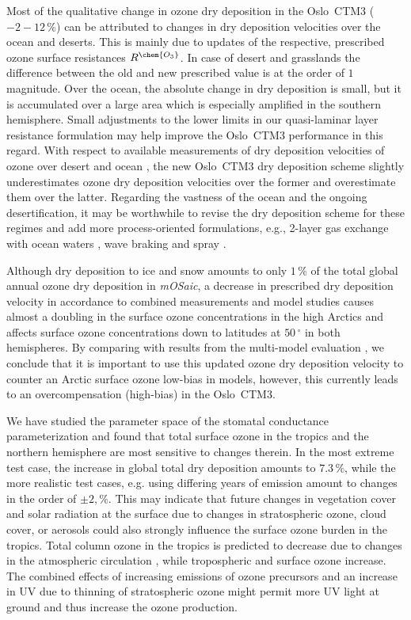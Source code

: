 \documentclass[gmd, manuscript]{copernicus}
\begin{document}
Most of the qualitative change in ozone dry deposition in the Oslo~CTM3 ($-2-12\,\unit{\%}$) can be attributed to changes in dry deposition velocities over the ocean and deserts. This is mainly due to updates of the respective, prescribed ozone surface resistances $R^\chem{O_3}$. In case of desert and grasslands the difference between the old and new prescribed value is at the order of $1$ magnitude. Over the ocean, the absolute change in dry deposition is small, but it is accumulated over a large area which is especially amplified in the southern hemisphere. Small adjustments to the lower limits in our quasi-laminar layer resistance formulation may help improve the Oslo~CTM3 performance in this regard. With respect to available measurements of dry deposition velocities of ozone over desert \citep{AE:Gusten1995} and ocean \citep{JGR:Helmig2012}, the new Oslo~CTM3 dry deposition scheme slightly underestimates ozone dry deposition velocities over the former and overestimate them over the latter. Regarding the vastness of the ocean and the ongoing desertification, it may be worthwhile to revise the dry deposition scheme for these regimes and add more process-oriented formulations, e.g., 2-layer gas exchange with ocean waters \citep{ACP:Luhar2017, ACP:Luhar2018}, wave braking and spray \citep{ACP:Pozzer2006}.

Although dry deposition to ice and snow amounts to only $1\,\unit{\%}$ of the total global annual ozone dry deposition in \emph{mOSaic}, a decrease in prescribed dry deposition velocity in accordance to combined measurements and model studies \citep{ACP:Helmig2007} causes almost a doubling in the surface ozone concentrations in the high Arctics and affects surface ozone concentrations down to latitudes at $50\,\unit{^\circ}$ in both hemispheres. By comparing with results from the multi-model evaluation \citep{ACP:Hardacre2015}, we conclude that it is important to use this updated ozone dry deposition velocity to counter an Arctic surface ozone low-bias in models, however, this currently leads to an overcompensation (high-bias) in the Oslo~CTM3.

We have studied the parameter space of the stomatal conductance parameterization and found that total surface ozone in the tropics and the northern hemisphere are most sensitive to changes therein. In the most extreme test case, the increase in global total dry deposition amounts to $7.3\,\unit{\%}$, while the more realistic test cases, e.g. using differing years of emission amount to changes in the order of $\pm 2,\unit{\%}$. This may indicate that future changes in vegetation cover and solar radiation at the surface due to changes in stratospheric ozone, cloud cover, or aerosols could also strongly influence the surface ozone burden in the tropics. Total column ozone in the tropics is predicted to decrease due to changes in the atmospheric circulation \citep[e.g.,][]{WMO2014}, while tropospheric and surface ozone increase. The combined effects of increasing emissions of ozone precursors and an increase in UV due to thinning of stratospheric ozone might permit more UV light at ground and thus increase the ozone production.
\end{document}
